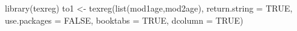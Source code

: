 \begin{Schunk}
\begin{Sinput}
 library(texreg)
 to1 <- texreg(list(mod1age,mod2age), return.string = TRUE, use.packages = FALSE, booktabs = TRUE, dcolumn = TRUE)
\end{Sinput}
\end{Schunk}
